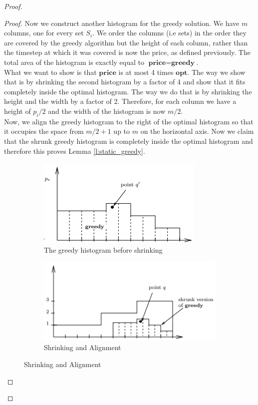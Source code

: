 \begin{proof}
\begin{proof}
        Now we construct another histogram for the greedy solution. We have $m$ columns, one for every set $S_i$. We order the columns (i.e sets) in the order they are covered by the greedy algorithm but the height of each column, rather than the timestep at which it was covered is now the price, as defined previously. The total area of the histogram is exactly equal to $\textbf{price}=\textbf{greedy}$. \\
        
        What we want to show is that $\textbf{price}$ is at most 4 times $\textbf{opt}$. The way we show that is by shrinking the second histogram by a factor of 4 and show that it fits completely inside the optimal histogram. The way we do that is by shrinking the height and the width by a factor of 2. Therefore, for each column we have a height of $p_i / 2$ and the width of the histogram is now $m/2$. \\
        
        Now, we align the greedy histogram to the right of the optimal histogram so that it occupies the space from $m/2 + 1$ up to $m$ on the horizontal axis. Now we claim that the shrunk greedy histogram is completely inside the optimal histogram and therefore this proves Lemma \ref{l:static_greedy}.
        
        \begin{figure}
            \centering
            \begin{subfigure}{.5\textwidth}
              \centering
              \includegraphics[width=.4\linewidth]{chapters/introduction/histogram_greedy.png}
              \caption{The greedy histogram before shrinking}
              \label{fig:sub1}
            \end{subfigure}%
            \begin{subfigure}{.5\textwidth}
              \centering
              \includegraphics[width=.4\linewidth]{chapters/introduction/histogram_fit.png}
              \caption{Shrinking and Alignment}
              \label{fig:sub2}
            \end{subfigure}
            \label{fig:test}
        \end{figure}
        

\end{proof}
\end{proof}
